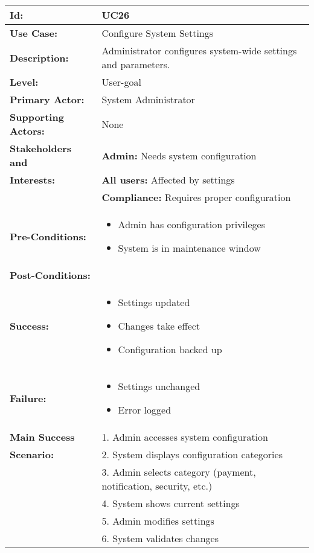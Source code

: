 \documentclass[12pt]{article}
\begin{document}
\begin{tabular}{|p{3cm}|p{11cm}|}
\hline
\textbf{Id:} & UC26 \\
\hline
\textbf{Use Case:} & Configure System Settings \\
\hline
\textbf{Description:} & Administrator configures system-wide settings and parameters. \\
\hline
\textbf{Level:} & User-goal \\
\hline
\textbf{Primary Actor:} & System Administrator \\
\hline
\textbf{Supporting Actors:} & None \\
\hline
\textbf{Stakeholders and} & \textbf{Admin:} Needs system configuration \\
\textbf{Interests:} & \textbf{All users:} Affected by settings \\
& \textbf{Compliance:} Requires proper configuration \\
\hline
\textbf{Pre-Conditions:} & 
\begin{itemize}
    \item Admin has configuration privileges
    \item System is in maintenance window
\end{itemize} \\
\hline
\textbf{Post-Conditions:} & \\
\textbf{Success:} & 
\begin{itemize}
    \item Settings updated
    \item Changes take effect
    \item Configuration backed up
\end{itemize} \\
\textbf{Failure:} & 
\begin{itemize}
    \item Settings unchanged
    \item Error logged
\end{itemize} \\
\hline
\textbf{Main Success} & 1. Admin accesses system configuration \\
\textbf{Scenario:} & 2. System displays configuration categories \\
& 3. Admin selects category (payment, notification, security, etc.) \\
& 4. System shows current settings \\
& 5. Admin modifies settings \\
& 6. System validates changes \\

\end{tabular}
\end{document}
